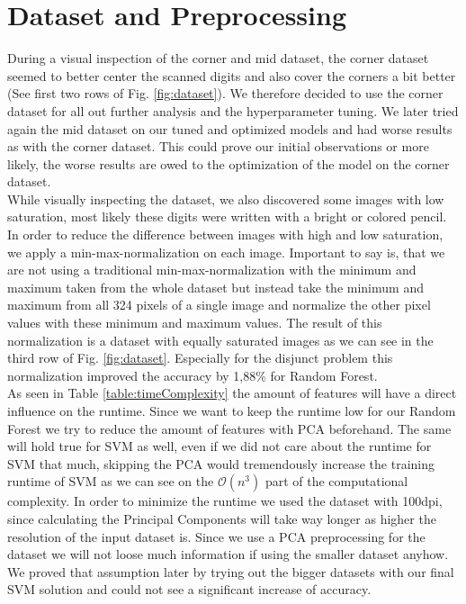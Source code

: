 \documentclass[conference]{IEEEtran}
\begin{document}
\section{Dataset and Preprocessing}
\textcolor{til}{
    During a visual inspection of the corner and mid dataset, the corner dataset seemed to better center the scanned digits and also cover the corners a bit better (See first two rows of Fig. \ref{fig:dataset}). We therefore decided to use the corner dataset for all out further analysis and the hyperparameter tuning. We later tried again the mid dataset on our tuned and optimized models and had worse results as with the corner dataset. This could prove our initial observations or more likely, the worse results are owed to the optimization of the model on the corner dataset. \\
    While visually inspecting the dataset, we also discovered some images with low saturation, most likely these digits were written with a bright or colored pencil. In order to reduce the difference between images with high and low saturation, we apply a min-max-normalization on each image. Important to say is, that we are not using a traditional min-max-normalization with the minimum and maximum taken from the whole dataset but instead take the minimum and maximum from all 324 pixels of a single image and normalize the other pixel values with these minimum and maximum values. The result of this normalization is a dataset with equally saturated images as we can see in the third row of Fig. \ref{fig:dataset}. Especially for the disjunct problem this normalization improved the accuracy by 1,88\% for Random Forest. \\
    As seen in Table \ref{table:timeComplexity} the amount of features will have a direct influence on the runtime. Since we want to keep the runtime low for our Random Forest we try to reduce the amount of features with PCA beforehand. The same will hold true for SVM as well, even if we did not care about the runtime for SVM that much, skipping the PCA would tremendously increase the training runtime of SVM as we can see on the $\mathcal{O}(n^3)$ part of the computational complexity. In order to minimize the runtime we used the dataset with 100dpi, since calculating the Principal Components will take way longer as higher the resolution of the input dataset is. Since we use a PCA preprocessing for the dataset we will not loose much information if using the smaller dataset anyhow. We proved that assumption later by trying out the bigger datasets with our final SVM solution and could not see a significant increase of accuracy.
}
\end{document}
